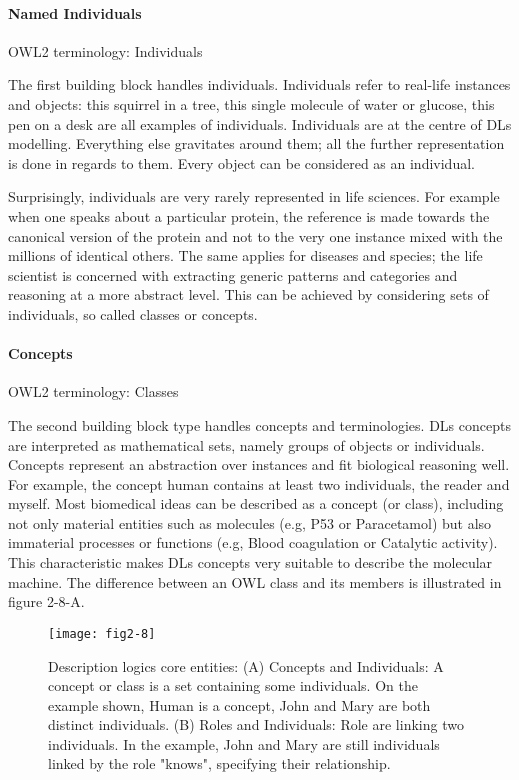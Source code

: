 \paragraph{\textbf{Named Individuals}\\}

OWL2 terminology: Individuals

The first building block handles individuals. Individuals refer to real-life instances and objects: this squirrel in a tree, this single molecule of water or glucose, this pen on a desk are all examples of individuals. Individuals are at the centre of DLs modelling. Everything else gravitates around them; all the further representation is done in regards to them. Every object can be considered as an individual.

Surprisingly, individuals are very rarely represented in life sciences. For example when one speaks about a particular protein, the reference is made towards the canonical version of the protein and not to the very one instance mixed with the millions of identical others. The same applies for diseases and species; the life scientist is concerned with extracting generic patterns and categories and reasoning at a more abstract level. This can be achieved by considering sets of individuals, so called classes or concepts.

\paragraph{\textbf{Concepts}\\}

OWL2 terminology: Classes

The second building block type handles concepts and terminologies. DLs concepts are interpreted as mathematical sets, namely groups of objects or individuals. Concepts represent an abstraction over instances and fit biological reasoning well. For example, the concept human contains at least two individuals, the reader and myself. Most biomedical ideas can be described as a concept (or class), including not only material entities such as molecules (e.g, P53 or Paracetamol) but also immaterial processes or functions (e.g, Blood coagulation or Catalytic activity). This characteristic makes DLs concepts very suitable to describe the molecular machine. The difference between an OWL class and its members is illustrated in figure 2-8-A.

\begin{figure}[ht]
    \centering
    \texttt{[image: fig2-8]}
    \caption{Description logics core entities: (A) Concepts and Individuals: A concept or class is a set containing some individuals. On the example shown, Human is a concept, John and Mary are both distinct individuals. (B) Roles and Individuals: Role are linking two individuals. In the example, John and Mary are still individuals linked by the role "knows", specifying their relationship.}
    \label{fig2-8}
\end{figure}

